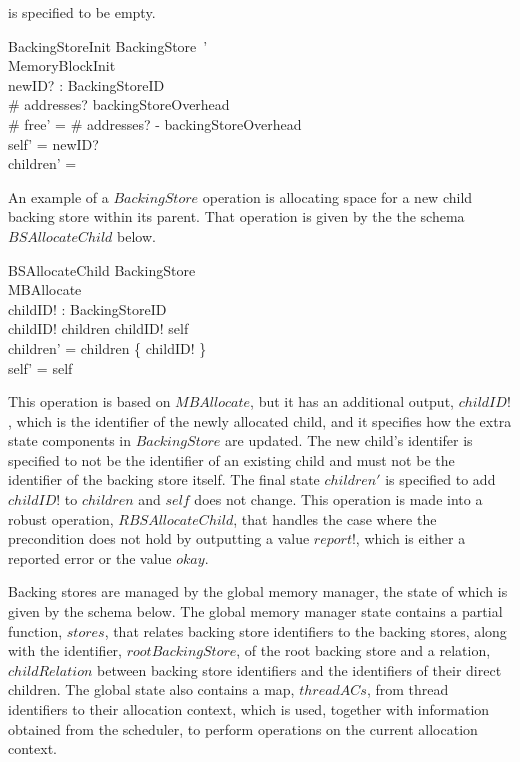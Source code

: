 \documentclass[a4paper,10pt]{article}
\begin{document}
is specified to be empty.
\begin{schema}{BackingStoreInit}
  BackingStore~' \\
  MemoryBlockInit \\
  newID? : BackingStoreID \\
\where
  \# addresses? \geq backingStoreOverhead \\
  \# free' = \# addresses? - backingStoreOverhead \\
  self' = newID? \\
  children' = \emptyset \\
\end{schema}
%
An example of a $BackingStore$ operation is allocating space for a new child
backing store within its parent. That operation is given by the the schema
$BSAllocateChild$ below.
%
\begin{schema}{BSAllocateChild}
  \Delta BackingStore \\
  MBAllocate \\
  childID! : BackingStoreID \\
  \where
  childID! \notin children \land childID! \neq self \\
  children' = children \cup \{ childID! \} \\
  self' = self
\end{schema}
%
This operation is based on $MBAllocate$, but it has an additional output,
$childID!$, which is the identifier of the newly allocated child, and it
specifies how the extra state components in $BackingStore$ are updated. The new
child's identifer is specified to not be the identifier of an existing child and
must not be the identifier of the backing store itself. The final state
$children'$ is specified to add $childID!$ to $children$ and $self$ does not
change. This operation is made into a robust operation, $RBSAllocateChild$, that
handles the case where the precondition does not hold by outputting a value
$report!$, which is either a reported error or the value $okay$.

Backing stores are managed by the global memory manager, the state of which is
given by the schema below. The global memory manager state contains a partial
function, $stores$, that relates backing store identifiers to the backing
stores, along with the identifier, $rootBackingStore$, of the root backing store
and a relation, $childRelation$ between backing store identifiers and the
identifiers of their direct children. The global state also contains a map,
$threadACs$, from thread identifiers to their allocation context, which is used,
together with information obtained from the scheduler, to perform operations on
the current allocation context.
\end{document}
